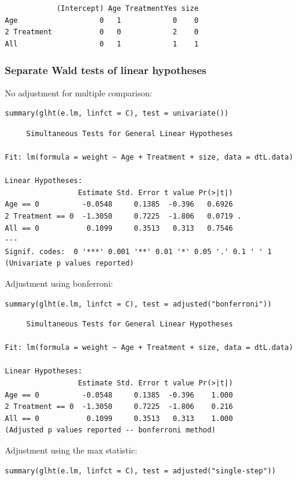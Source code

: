\documentclass{article}
\begin{document}
\begin{verbatim}
            (Intercept) Age TreatmentYes size
Age                   0   1            0    0
2 Treatment           0   0            2    0
All                   0   1            1    1
\end{verbatim}

\subsubsection{Separate Wald tests of linear hypotheses}
\label{sec:orgb4f06c3}

No adjustment for multiple comparison:
\lstset{language=r,label= ,caption= ,captionpos=b,numbers=none}
\begin{lstlisting}
summary(glht(e.lm, linfct = C), test = univariate())
\end{lstlisting}

\begin{verbatim}
	 Simultaneous Tests for General Linear Hypotheses

Fit: lm(formula = weight ~ Age + Treatment + size, data = dtL.data)

Linear Hypotheses:
                 Estimate Std. Error t value Pr(>|t|)  
Age == 0          -0.0548     0.1385  -0.396   0.6926  
2 Treatment == 0  -1.3050     0.7225  -1.806   0.0719 .
All == 0           0.1099     0.3513   0.313   0.7546  
---
Signif. codes:  0 '***' 0.001 '**' 0.01 '*' 0.05 '.' 0.1 ' ' 1
(Univariate p values reported)
\end{verbatim}

Adjustment using bonferroni:
\lstset{language=r,label= ,caption= ,captionpos=b,numbers=none}
\begin{lstlisting}
summary(glht(e.lm, linfct = C), test = adjusted("bonferroni"))
\end{lstlisting}

\begin{verbatim}
	 Simultaneous Tests for General Linear Hypotheses

Fit: lm(formula = weight ~ Age + Treatment + size, data = dtL.data)

Linear Hypotheses:
                 Estimate Std. Error t value Pr(>|t|)
Age == 0          -0.0548     0.1385  -0.396    1.000
2 Treatment == 0  -1.3050     0.7225  -1.806    0.216
All == 0           0.1099     0.3513   0.313    1.000
(Adjusted p values reported -- bonferroni method)
\end{verbatim}

Adjustment using the max statistic:
\lstset{language=r,label= ,caption= ,captionpos=b,numbers=none}
\begin{lstlisting}
summary(glht(e.lm, linfct = C), test = adjusted("single-step"))
\end{lstlisting}
\end{document}
